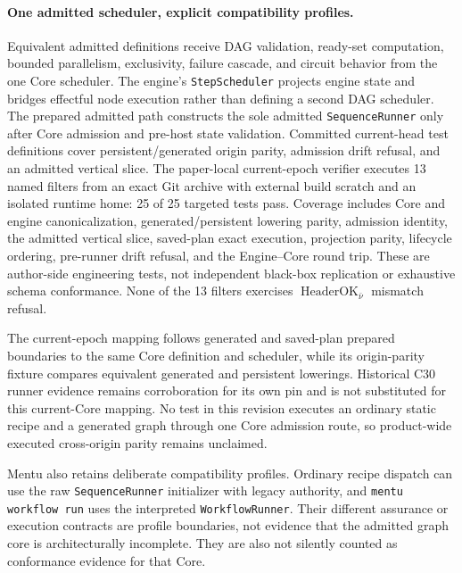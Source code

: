 \documentclass[11pt]{article}
\newcommand{\code}[1]{\texttt{#1}}
\begin{document}
\paragraph{One admitted scheduler, explicit compatibility profiles.}
Equivalent admitted definitions receive DAG validation, ready-set computation,
bounded parallelism, exclusivity, failure cascade, and circuit behavior from
the one Core scheduler. The engine's \code{StepScheduler} projects engine state
and bridges effectful node execution rather than defining a second DAG
scheduler. The prepared admitted path constructs the sole admitted
\code{SequenceRunner} only after Core admission and pre-host state validation.
Committed current-head test definitions cover persistent/generated origin
parity, admission drift refusal, and an admitted vertical slice. The
paper-local current-epoch verifier executes 13 named filters from an exact
Git archive with external build scratch and an isolated runtime home:
25 of 25 targeted tests pass. Coverage includes Core and engine
canonicalization, generated/persistent lowering parity, admission identity,
the admitted vertical slice, saved-plan exact execution, projection parity,
lifecycle ordering, pre-runner drift refusal, and the Engine--Core round trip.
These are author-side engineering tests, not independent black-box
replication or exhaustive schema conformance. None of the 13 filters exercises
\(\operatorname{HeaderOK}_{\bar\nu}\) mismatch refusal.

The current-epoch mapping follows generated and saved-plan prepared boundaries
to the same Core definition and scheduler, while its origin-parity fixture
compares equivalent generated and persistent lowerings. Historical C30 runner
evidence remains corroboration for its own pin and is not substituted for this
current-Core mapping. No test in this revision executes an ordinary static
recipe and a generated graph through one Core admission route, so
product-wide executed cross-origin parity remains unclaimed.

Mentu also retains deliberate compatibility profiles. Ordinary recipe dispatch
can use the raw \code{SequenceRunner} initializer with legacy authority, and
\code{mentu workflow run} uses the interpreted \code{WorkflowRunner}. Their
different assurance or execution contracts are profile boundaries, not
evidence that the admitted graph core is architecturally incomplete. They are
also not silently counted as conformance evidence for that Core.
\end{document}
